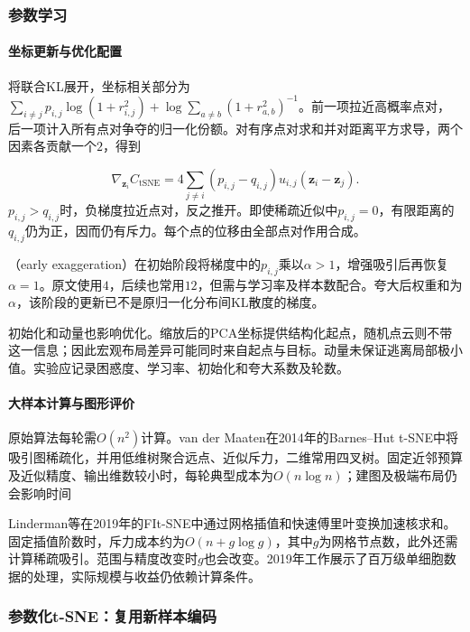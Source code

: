 \subsubsection{参数学习}

\paragraph{坐标更新与优化配置}

将联合KL展开，坐标相关部分为$\sum_{i\ne j}p_{i,j}\log(1+r_{i,j}^2)+\log\sum_{a\ne b}(1+r_{a,b}^2)^{-1}$。前一项拉近高概率点对，后一项计入所有点对争夺的归一化份额。对有序点对求和并对距离平方求导，两个因素各贡献一个$2$，得到

\begin{equation}
  \label{eq:dim-tsne-gradient}
  \nabla_{\bm{z}_i}C_{\mathrm{tSNE}}
    =4\sum_{j\ne i}(p_{i,j}-q_{i,j})u_{i,j}
      (\bm{z}_i-\bm{z}_j).
\end{equation}
$p_{i,j}>q_{i,j}$时，负梯度拉近点对，反之推开。即使稀疏近似中$p_{i,j}=0$，有限距离的$q_{i,j}$仍为正，因而仍有斥力。每个点的位移由全部点对作用合成。

（early exaggeration）在初始阶段将梯度中的$p_{i,j}$乘以$\alpha>1$，增强吸引后再恢复$\alpha=1$。原文使用$4$，后续也常用$12$，但需与学习率及样本数配合。夸大后权重和为$\alpha$，该阶段的更新已不是原归一化分布间KL散度的梯度。

初始化和动量也影响优化。缩放后的PCA坐标提供结构化起点，随机点云则不带这一信息；因此宏观布局差异可能同时来自起点与目标。动量未保证逃离局部极小值。实验应记录困惑度、学习率、初始化和夸大系数及轮数。

\paragraph{大样本计算与图形评价}

原始算法每轮需$O(n^2)$计算。van der Maaten在2014年的Barnes--Hut t-SNE中将吸引图稀疏化，并用低维树聚合远点、近似斥力，二维常用四叉树。固定近邻预算及近似精度、输出维数较小时，每轮典型成本为$O(n\log n)$；建图及极端布局仍会影响时间

Linderman等在2019年的FIt-SNE中通过网格插值和快速傅里叶变换加速核求和。固定插值阶数时，斥力成本约为$O(n+g\log g)$，其中$g$为网格节点数，此外还需计算稀疏吸引。范围与精度改变时$g$也会改变。2019年工作展示了百万级单细胞数据的处理，实际规模与收益仍依赖计算条件。

\subsubsection{参数化t-SNE：复用新样本编码}

